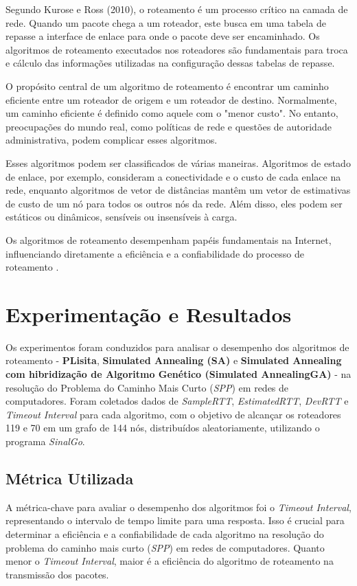 \documentclass[conference]{IEEEtran}
\begin{document}
Segundo Kurose e Ross (2010), o roteamento é um processo crítico na camada de rede. Quando um pacote chega a um roteador, este busca em uma tabela de repasse a interface de enlace para onde o pacote deve ser encaminhado. Os algoritmos de roteamento executados nos roteadores são fundamentais para troca e cálculo das informações utilizadas na configuração dessas tabelas de repasse.

O propósito central de um algoritmo de roteamento é encontrar um caminho eficiente entre um roteador de origem e um roteador de destino. Normalmente, um caminho eficiente é definido como aquele com o "menor custo". No entanto, preocupações do mundo real, como políticas de rede e questões de autoridade administrativa, podem complicar esses algoritmos.

Esses algoritmos podem ser classificados de várias maneiras. Algoritmos de estado de enlace, por exemplo, consideram a conectividade e o custo de cada enlace na rede, enquanto algoritmos de vetor de distâncias mantêm um vetor de estimativas de custo de um nó para todos os outros nós da rede. Além disso, eles podem ser estáticos ou dinâmicos, sensíveis ou insensíveis à carga.

Os algoritmos de roteamento desempenham papéis fundamentais na Internet, influenciando diretamente a eficiência e a confiabilidade do processo de roteamento \cite{KuroseRoss2010}.

\section{Experimentação e Resultados}

Os experimentos foram conduzidos para analisar o desempenho dos algoritmos de roteamento - \textbf{PLisita}, \textbf{Simulated Annealing (SA)} e \textbf{Simulated Annealing com hibridização de Algoritmo Genético (Simulated AnnealingGA)} - na resolução do Problema do Caminho Mais Curto (\textit{SPP}) em redes de computadores. Foram coletados dados de \textit{SampleRTT}, \textit{EstimatedRTT}, \textit{DevRTT} e \textit{Timeout Interval} para cada algoritmo, com o objetivo de alcançar os roteadores 119 e 70 em um grafo de 144 nós, distribuídos aleatoriamente, utilizando o programa \textit{SinalGo}.

\subsection{Métrica Utilizada}
A métrica-chave para avaliar o desempenho dos algoritmos foi o \textit{Timeout Interval}, representando o intervalo de tempo limite para uma resposta. Isso é crucial para determinar a eficiência e a confiabilidade de cada algoritmo na resolução do problema do caminho mais curto (\textit{SPP}) em redes de computadores. Quanto menor o \textit{Timeout Interval}, maior é a eficiência do algoritmo de roteamento na transmissão dos pacotes.
\end{document}
